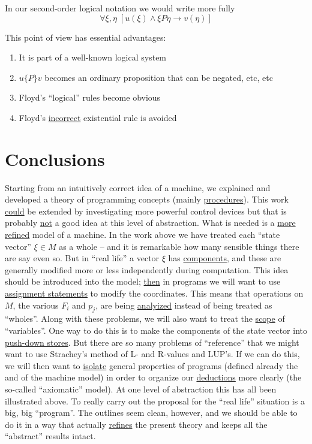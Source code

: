 \documentclass{article}
\begin{document}
In our second-order logical notation we would write more fully
\begin{equation*}
    \forall \xi, \eta \; [u(\xi) \wedge \xi P \eta \to v(\eta)]
\end{equation*}

This point of view has essential advantages:
\begin{enumerate}
    \item It is part of a well-known logical system 
    \item $u \{P\} v$ becomes an ordinary proposition that can be negated, etc, etc
    \item Floyd's ``logical'' rules become obvious
    \item Floyd's \underline{incorrect} existential rule is avoided
\end{enumerate}

\section{Conclusions}
Starting from an intuitively correct idea of a machine, we explained and developed a theory of programming concepts (mainly \underline{procedures}). This work \underline{could} be extended by investigating more powerful control devices but that is probably \underline{not} a good idea at this level of abstraction. What is needed is a \underline{more refined} model of a machine. In the work above we have treated each ``state vector'' $\xi \in M$ as a whole -- and it is remarkable how many sensible things there are say even so. But in ``real life'' a vector $\xi$ has \underline{components}, and these are generally modified more or less independently during computation. This idea should be introduced into the model; \underline{then} in programs we will want to use \underline{assignment statements} to modify the coordinates. This means that operations on $M$, the various $F_i$ and $p_j$, are being \underline{analyized} instead of being treated as ``wholes''. Along with these problems, we will also want to treat the \underline{scope} of ``variables''. One way to do this is to make the components of the state vector into \underline{push-down stores}. But there are so many problems of ``reference'' that we might want to use Strachey's method of L- and R-values and LUP's. If we can do this, we will then want to \underline{isolate} general properties of programs (defined already the and of the machine model) in order to organize our \underline{deductions} more clearly (the so-called ``axiomatic'' model). At one level of abstraction this has all been illustrated above. To really carry out the proposal for the ``real life'' situation is a big, big ``program''. The outlines seem clean, however, and we should be able to do it in a way that actually \underline{refines} the present theory and keeps all the ``abstract'' results intact. 
\end{document}
